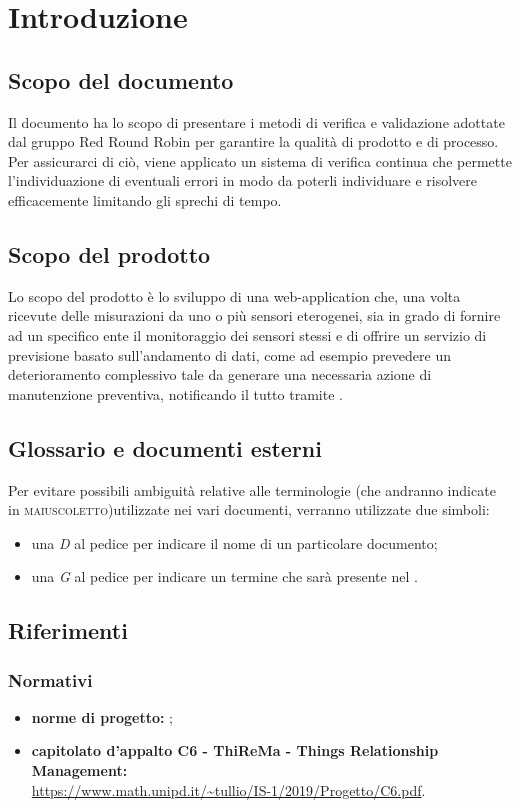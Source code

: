 \section{Introduzione}
	\subsection{Scopo del documento}
		Il documento ha lo scopo di presentare i metodi di verifica e validazione adottate dal gruppo Red Round Robin per garantire la qualità di prodotto e di processo. Per assicurarci di ciò, viene applicato un sistema di verifica continua che permette l'individuazione di eventuali errori in modo da poterli individuare e risolvere efficacemente limitando gli sprechi di tempo.
	\subsection{Scopo del prodotto}
		Lo scopo del prodotto è lo sviluppo di una web-application che, una volta ricevute delle misurazioni da uno o più sensori eterogenei, sia in grado di fornire ad un specifico ente il monitoraggio dei sensori stessi e di offrire un servizio di previsione basato sull'andamento di dati, come ad esempio prevedere un deterioramento complessivo tale da generare una necessaria azione di manutenzione preventiva, notificando il tutto tramite .

	\subsection{Glossario e documenti esterni}
		Per evitare possibili ambiguità relative alle terminologie (che andranno indicate in \textsc{maiuscoletto})utilizzate nei vari documenti, verranno utilizzate due simboli:
		\begin{itemize}
			\item una \textit{D} al pedice per indicare il nome di un particolare documento;
			\item una \textit{G} al pedice per indicare un termine che sarà
			presente nel .
		\end{itemize}

	\subsection{Riferimenti}
		\subsubsection{Normativi}
		\begin{itemize}
			\item \textbf{norme di progetto:} ;
			\item \textbf{capitolato d’appalto C6 - ThiReMa - Things Relationship Management:}\\
			\url{https://www.math.unipd.it/~tullio/IS-1/2019/Progetto/C6.pdf}.
		\end{itemize}
